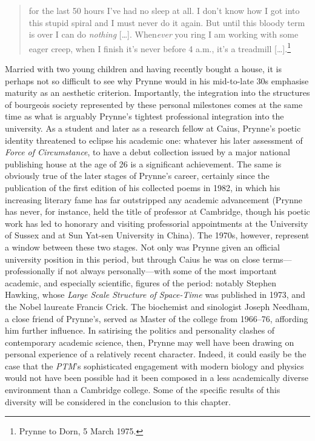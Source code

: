 \documentclass[]{article}
\begin{document}
\begin{quote}
for the last 50 hours I've had no sleep at all. I don't know how I got
into this stupid spiral and I must never do it again. But until this
bloody term is over I can do \emph{nothing} {[}\ldots{}{]}.
When\emph{ever} you ring I am working with some eager creep, when I
finish it's never before 4 a.m., it's a treadmill
{[}\ldots{}{]}.\footnote{Prynne to Dorn, 5 March 1975.}
\end{quote}

\noindent Married with two young children and having recently bought a
house, it is perhaps not so difficult to see why Prynne would in his
mid-to-late 30s emphasise maturity as an aesthetic criterion.
Importantly, the integration into the structures of bourgeois society
represented by these personal milestones comes at the same time as what
is arguably Prynne's tightest professional integration into the
university. As a student and later as a research fellow at Caius,
Prynne's poetic identity threatened to eclipse his academic one:
whatever his later assessment of \emph{Force of Circumstance}, to have a
debut collection issued by a major national publishing house at the age
of 26 is a significant achievement. The same is obviously true of the
later stages of Prynne's career, certainly since the publication of the
first edition of his collected poems in 1982, in which his increasing
literary fame has far outstripped any academic advancement (Prynne has
never, for instance, held the title of professor at Cambridge, though
his poetic work has led to honorary and visiting professorial
appointments at the University of Sussex and at Sun Yat-sen University
in China). The 1970s, however, represent a window between these two
stages. Not only was Prynne given an official university position in
this period, but through Caius he was on close terms---professionally if
not always personally---with some of the most important academic, and
especially scientific, figures of the period: notably Stephen Hawking,
whose \emph{Large Scale Structure of Space-Time} was published in 1973,
and the Nobel laureate Francis Crick. The biochemist and sinologist
Joseph Needham, a close friend of Prynne's, served as Master of the
college from 1966--76, affording him further influence. In satirising
the politics and personality clashes of contemporary academic science,
then, Prynne may well have been drawing on personal experience of a
relatively recent character. Indeed, it could easily be the case that
the \emph{PTM}'s sophisticated engagement with modern biology and
physics would not have been possible had it been composed in a less
academically diverse environment than a Cambridge college. Some of the
specific results of this diversity will be considered in the conclusion
to this chapter.
\end{document}
